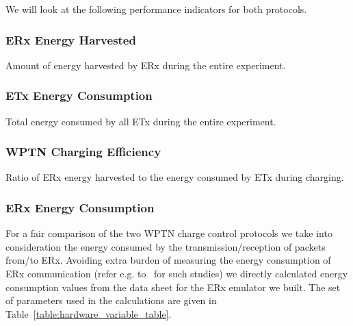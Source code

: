 \documentclass[11pt,draftclsnofoot,journal,onecolumn]{IEEEtran}
\begin{document}
We will look at the following performance indicators for both protocols.

\subsubsection{ERx Energy Harvested}
\label{sec:energy_harvested_metric}

Amount of energy harvested by ERx during the entire experiment.

\subsubsection{ETx Energy Consumption}
\label{sec:etx_energy_consumption}

Total energy consumed by all ETx during the entire experiment.

\subsubsection{WPTN Charging Efficiency}
\label{sec:}

Ratio of ERx energy harvested to the energy consumed by ETx during charging.

\subsubsection{ERx Energy Consumption}
\label{sec:energy_consumption_metric}

For a fair comparison of the two WPTN charge control protocols we take into consideration the energy consumed by the transmission/reception of packets from/to ERx. Avoiding extra burden of measuring the energy consumption of ERx communication (refer e.g. to~\cite{casilari_sensors_2010} for such studies) we directly calculated energy consumption values from the data sheet for the ERx emulator we built. The set of parameters used in the calculations are given in Table~\ref{table:hardware_variable_table}.
\end{document}

